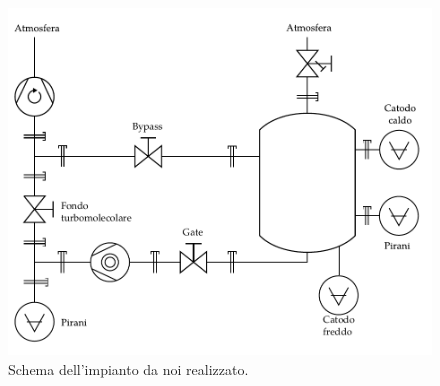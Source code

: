 \begin{figure}[b!]
    \includegraphics[width=14.5cm]{drawing.pdf}
    \caption{Schema dell'impianto da noi realizzato.}
    \label{fig:schema}
\end{figure}
